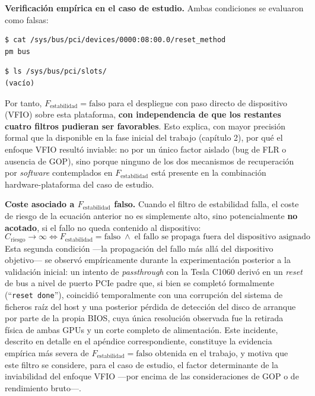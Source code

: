 \textbf{Verificación empírica en el caso de estudio.} Ambas condiciones se evaluaron como falsas:
\begin{Verbatim}[fontsize=\small]
$ cat /sys/bus/pci/devices/0000:08:00.0/reset_method
pm bus
\end{Verbatim}
\begin{Verbatim}[fontsize=\small]
$ ls /sys/bus/pci/slots/
(vacío)
\end{Verbatim}
Por tanto, $F_{\text{estabilidad}} = \text{falso}$ para el despliegue con paso directo de dispositivo (VFIO) sobre esta plataforma, \textbf{con independencia de que los restantes cuatro filtros pudieran ser favorables}. Esto explica, con mayor precisión formal que la disponible en la fase inicial del trabajo (capítulo 2), por qué el enfoque VFIO resultó inviable: no por un único factor aislado (bug de FLR o ausencia de GOP), sino porque ninguno de los dos mecanismos de recuperación por \textit{software} contemplados en $F_{\text{estabilidad}}$ está presente en la combinación hardware-plataforma del caso de estudio.

\textbf{Coste asociado a $F_{\text{estabilidad}}$ falso.} Cuando el filtro de estabilidad falla, el coste de riesgo de la ecuación anterior no es simplemente alto, sino potencialmente \textbf{no acotado}, si el fallo no queda contenido al dispositivo:
\begin{equation}
C_{\text{riesgo}} \to \infty \iff F_{\text{estabilidad}} = \text{falso} \;\land\; \text{el fallo se propaga fuera del dispositivo asignado}
\end{equation}
Esta segunda condición ---la propagación del fallo más allá del dispositivo objetivo--- 
se observó empíricamente durante la experimentación posterior a la validación inicial: un intento 
de \textit{passthrough} con la Tesla C1060 derivó en un \textit{reset} de bus a nivel de puerto PCIe padre que, 
si bien se completó formalmente (``\texttt{reset done}''), coincidió temporalmente con una corrupción del sistema
de ficheros raíz del host y una posterior pérdida de detección del disco de arranque por parte de la propia BIOS, 
cuya única resolución observada fue la retirada física de ambas GPUs y un corte completo de alimentación. Este incidente, 
descrito en detalle en el apéndice correspondiente, constituye la evidencia empírica más severa de $F_{\text{estabilidad}} 
= \text{falso}$ obtenida en el trabajo, y motiva que este filtro se considere, para el caso de estudio, 
el factor determinante de la inviabilidad del enfoque VFIO ---por encima de las consideraciones de GOP o 
de rendimiento bruto---.

